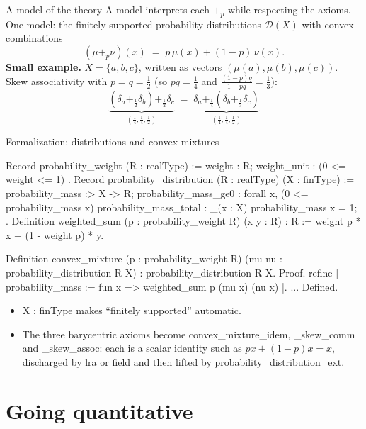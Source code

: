\documentclass[10pt,aspectratio=169]{beamer}
\newcommand{\Dist}{\mathcal{D}}
\newcommand{\bpl}[1]{+_{#1}}
\newcommand{\rid}[1]{{\ttfamily\small #1}}
\begin{document}
\begin{frame}{A model of the theory}
    A model interprets each $\bpl{p}$ while respecting the axioms.
    \vfill
    One model: the finitely supported probability distributions
    $\Dist(X)$ with convex combinations
    \[
        (\mu \bpl{p} \nu)(x) \;=\; p\,\mu(x) + (1-p)\,\nu(x).
    \]
    \vfill
    \pause
    \textbf{Small example.} $X = \{a,b,c\}$, written as vectors
    $(\mu(a),\mu(b),\mu(c))$. Skew associativity with $p = q = \tfrac12$
    (so $pq = \tfrac14$ and $\tfrac{(1-p)q}{1-pq} = \tfrac13$):
    \[
        \underbrace{(\delta_a \bpl{\frac12} \delta_b) \bpl{\frac12} \delta_c}
        _{(\frac14,\frac14,\frac12)}
        \;=\;
        \underbrace{\delta_a \bpl{\frac14}
        (\delta_b \bpl{\frac13} \delta_c)}_{(\frac14,\frac14,\frac12)}
    \]
\end{frame}

\begin{frame}[fragile]{Formalization: distributions and convex mixtures}
    \begin{srcbox}
Record probability_weight (R : realType) := {
  weight : R;   weight_unit : (0 <= weight <= 1)%
}.
Record probability_distribution (R : realType) (X : finType) := {
  probability_mass :> X -> R;
  probability_mass_ge0 : forall x, (0 <= probability_mass x)%
  probability_mass_total : \sum_(x : X) probability_mass x = 1;
}.
Definition weighted_sum (p : probability_weight R) (x y : R) : R :=
  weight p * x + (1 - weight p) * y.

Definition convex_mixture (p : probability_weight R)
    (mu nu : probability_distribution R X) : probability_distribution R X.
Proof.
  refine {| probability_mass := fun x => weighted_sum p (mu x) (nu x) |}.
  ...
Defined.
    \end{srcbox}
    \begin{itemize}
        \item \rid{X : finType} makes ``finitely supported'' automatic.
        \item The three barycentric axioms become
            \rid{convex\_mixture\_idem}, \rid{\_skew\_comm} and
            \rid{\_skew\_assoc}: each is a scalar identity such as
            $px + (1-p)x = x$, discharged by \rid{lra} or \rid{field} and
            then lifted by \rid{probability\_distribution\_ext}.
    \end{itemize}
\end{frame}

\section{Going quantitative}
\end{document}

